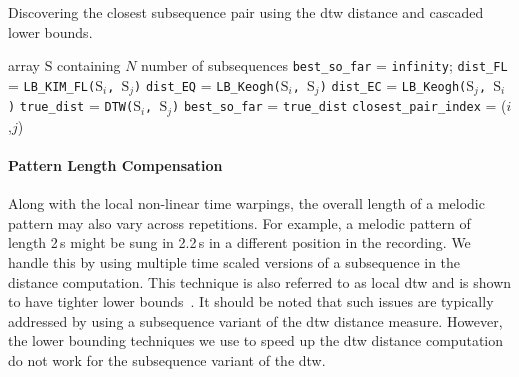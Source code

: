 \renewcommand{\algorithmiccomment}[1]{\bgroup\hfill\tiny//~#1\egroup}
\begin{algorithm}
\caption{Discovering the closest subsequence pair using the \gls{dtw} distance and cascaded lower bounds.}
\label{alg:algorithmdiscovery}
	\begin{algorithmic} 
	
	 array $\mathrm{S}$ containing $N$ number of subsequences
	\State \texttt{best\_so\_far} = \texttt{infinity};
			\State  \texttt{dist\_FL} = \texttt{LB\_KIM\_FL($\mathrm{S}_i$, $\mathrm{S}_j$)}			
				\State  \texttt{dist\_EQ} = \texttt{LB\_Keogh($\mathrm{S}_i$, $\mathrm{S}_j$)}				
					\State  \texttt{dist\_EC} = \texttt{LB\_Keogh($\mathrm{S}_j$, $\mathrm{S}_i$)}					
						\State  \texttt{true\_dist} = \texttt{DTW($\mathrm{S}_i$, $\mathrm{S}_j$)}						
							\State \texttt{best\_so\_far} = \texttt{true\_dist}
							\State \texttt{closest\_pair\_index} = ($i$,$j$)							
						\EndIf
					\EndIf
				\EndIf
			\EndIf
		\EndFor
	\EndFor
	
	\end{algorithmic}
\end{algorithm}
				

\paragraph{Pattern Length Compensation}
\label{PatternLengthCompensation}

Along with the local non-linear time warpings, the overall length of a melodic pattern may also vary across repetitions. For example, a melodic pattern of length 2\,s might be sung in 2.2\,s in a different position in the recording. We handle this by using multiple time scaled versions of a subsequence in the distance computation. This technique is also referred to as local \gls{dtw} and is shown to have tighter lower bounds~\citep{Zhu2003}. It should be noted that such issues are typically addressed by using a subsequence variant of the \gls{dtw} distance measure. However, the lower bounding techniques we use to speed up the \gls{dtw} distance computation do not work for the subsequence variant of the \gls{dtw}. 

